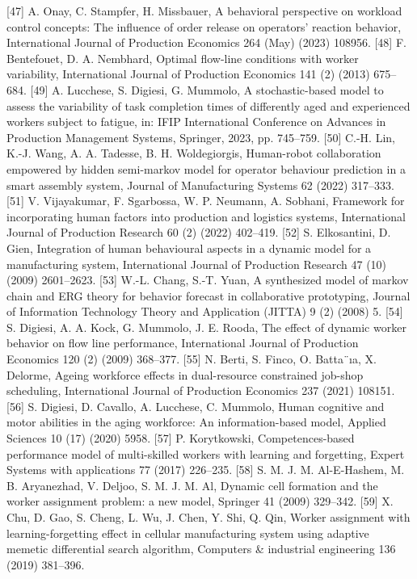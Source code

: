 [47]	A. Onay, C. Stampfer, H. Missbauer, A behavioral perspective on workload control concepts: The influence of order release on operators’ reaction behavior, International Journal of Production Economics 264 (May) (2023) 108956.
[48]	F. Bentefouet, D. A. Nembhard, Optimal flow-line conditions with worker variability, International Journal of
Production Economics 141 (2) (2013) 675–684.
[49]	A. Lucchese, S. Digiesi, G. Mummolo, A stochastic-based model to assess the variability of task completion times of differently aged and experienced workers subject to fatigue, in: IFIP International Conference on Advances in Production Management Systems, Springer, 2023, pp. 745–759.
[50]	C.-H. Lin, K.-J. Wang, A. A. Tadesse, B. H. Woldegiorgis, Human-robot collaboration empowered by hidden semi-markov model for operator behaviour prediction in a smart assembly system, Journal of Manufacturing Systems 62 (2022) 317–333.
[51]	V. Vijayakumar, F. Sgarbossa, W. P. Neumann, A. Sobhani, Framework for incorporating human factors into production and logistics systems, International Journal of Production Research 60 (2) (2022) 402–419.
[52]	S. Elkosantini, D. Gien, Integration of human behavioural aspects in a dynamic model for a manufacturing system, International Journal of Production Research 47 (10) (2009) 2601–2623.
[53]	W.-L. Chang, S.-T. Yuan, A synthesized model of markov chain and ERG theory for behavior forecast in collaborative prototyping, Journal of Information Technology Theory and Application (JITTA) 9 (2) (2008) 5.
[54]	S. Digiesi, A. A. Kock, G. Mummolo, J. E. Rooda, The effect of dynamic worker behavior on flow line performance, International Journal of Production Economics 120 (2) (2009) 368–377.
[55]	N. Berti, S. Finco, O. Batta¨ıa, X. Delorme, Ageing workforce effects in dual-resource constrained job-shop scheduling, International Journal of Production Economics 237 (2021) 108151.
[56]	S. Digiesi, D. Cavallo, A. Lucchese, C. Mummolo, Human cognitive and motor abilities in the aging workforce: An information-based model, Applied Sciences 10 (17) (2020) 5958.
[57]	P. Korytkowski, Competences-based performance model of multi-skilled workers with learning and forgetting,
Expert Systems with applications 77 (2017) 226–235.
[58]	S. M. J. M. Al-E-Hashem, M. B. Aryanezhad, V. Deljoo, S. M. J. M. Al, Dynamic cell formation and the worker assignment problem: a new model, Springer 41 (2009) 329–342.
[59]	X. Chu, D. Gao, S. Cheng, L. Wu, J. Chen, Y. Shi, Q. Qin, Worker assignment with learning-forgetting effect in cellular manufacturing system using adaptive memetic differential search algorithm, Computers & industrial engineering 136 (2019) 381–396.
